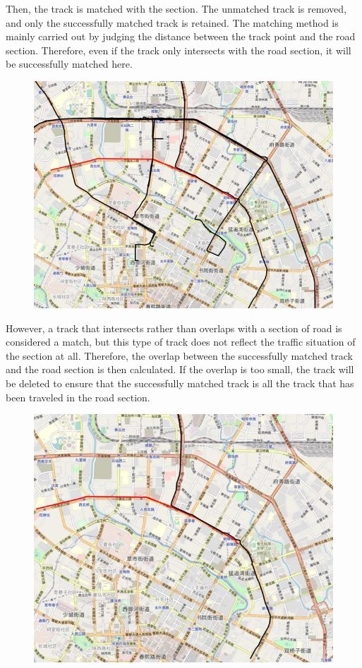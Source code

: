 \documentclass[fontset=none]{ctexart}
\theoremstyle{definition}
\theoremstyle{remark}
\begin{document}
\clearpage
Then, the track is matched with the section. The unmatched track is removed, and only the successfully matched track is retained. The matching method is mainly carried out by judging the distance between the track point and the road section. Therefore, even if the track only intersects with the road section, it will be successfully matched here.
\begin{figure}[htb]
  \centering
  \includegraphics[width=\textwidth]{images/tti3-2.jpg}
\end{figure}

\clearpage
However, a track that intersects rather than overlaps with a section of road is considered a match, but this type of track does not reflect the traffic situation of the section at all.
Therefore, the overlap between the successfully matched track and the road section is then calculated. If the overlap is too small, the track will be deleted to ensure that the successfully matched track is all the track that has been traveled in the road section.
\begin{figure}[htb]
  \centering
  \includegraphics[width=\textwidth]{images/tti3-3.jpg}
\end{figure}
\end{document}
